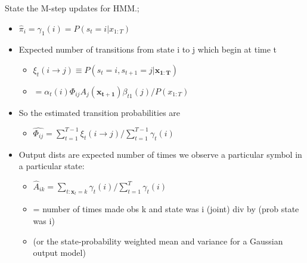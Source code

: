 \documentclass{article}
\begin{document}
State the M-step updates for HMM.; \begin{itemize} \item $\hat{\pi}_i = \gamma_1(i) = P(s_t=i|x_{1:T})$ \item Expected number of transitions from state i to j which begin at time t \begin{itemize} \item $\xi_t(i\rightarrow j) \equiv P(s_t=i, s_{t+1}=j|\mathbf{x_{1:T}})$ \item $=\alpha_t(i)\Phi_{ij}A_j(\mathbf{x_{t+1}})\beta_{t 1}(j)/P(x_{1:T})$ \end{itemize} \item So the estimated transition probabilities are \begin{itemize} \item $\hat{\Phi_{ij}}=\sum_{t=1}^{T-1}\xi_t(i\rightarrow j)/\sum_{t=1}^{T-1}\gamma_t(i)$ \end{itemize} \item Output dists are expected number of times we observe a particular symbol in a particular state: \begin{itemize} \item $\hat{A}_{ik}=\sum_{t:\mathbf{x}_t=k}\gamma_t(i)\big / \sum_{t=1}^T\gamma_t(i)$ \item = number of times made obs k and state was i (joint) div by (prob state was i) \item (or the state-probability weighted mean and variance for a Gaussian output model) \end{itemize} \end{itemize}
\end{document}

